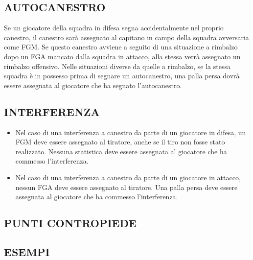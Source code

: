\subsection{AUTOCANESTRO}
\subsectionline

Se un giocatore della squadra in difesa segna accidentalmente nel proprio canestro, il canestro sarà assegnato al capitano in campo della squadra avversaria come FGM. Se questo canestro avviene a seguito di una situazione a rimbalzo dopo un FGA mancato dalla squadra in attacco, alla stessa verrà assegnato un rimbalzo offensivo. Nelle situazioni diverse da quelle a rimbalzo, se la stessa squadra è in possesso prima di segnare un autocanestro, una palla persa dovrà essere assegnata al giocatore che ha segnato l'autocanestro.

\subsection{INTERFERENZA}
\subsectionline

\begin{itemize}
    \item Nel caso di una interferenza a canestro da parte di un giocatore in difesa, un FGM deve essere assegnato al tiratore, anche se il tiro non fosse stato realizzato. Nessuna statistica deve essere assegnata al giocatore che ha commesso l'interferenza.
    \item Nel caso di una interferenza a canestro da parte di un giocatore in attacco, nessun FGA deve essere assegnato al tiratore. Una palla persa deve essere assegnata al giocatore che ha commesso l'interferenza.
\end{itemize}

\subsection{PUNTI CONTROPIEDE}
\subsectionline

\subsection{ESEMPI}
\subsectionline




